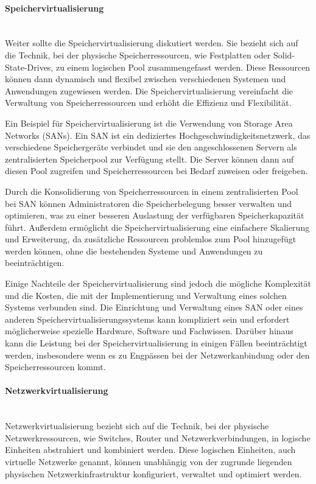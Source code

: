 \paragraph{Speichervirtualisierung\\\\}
Weiter sollte die Speichervirtualisierung diskutiert werden. Sie bezieht sich auf die Technik, bei der physische Speicherressourcen, wie Festplatten oder Solid-State-Drives, zu einem logischen Pool zusammengefasst werden. Diese Ressourcen können dann dynamisch und flexibel zwischen verschiedenen Systemen und Anwendungen zugewiesen werden. Die Speichervirtualisierung vereinfacht die Verwaltung von Speicherressourcen und erhöht die Effizienz und Flexibilität.

Ein Beispiel für Speichervirtualisierung ist die Verwendung von Storage Area Networks (SANs). Ein SAN ist ein dediziertes Hochgeschwindigkeitsnetzwerk, das verschiedene Speichergeräte verbindet und sie den angeschlossenen Servern als zentralisierten Speicherpool zur Verfügung stellt. Die Server können dann auf diesen Pool zugreifen und Speicherressourcen bei Bedarf zuweisen oder freigeben.

Durch die Konsolidierung von Speicherressourcen in einem zentralisierten Pool bei SAN können Administratoren die Speicherbelegung besser verwalten und optimieren, was zu einer besseren Auslastung der verfügbaren Speicherkapazität führt. Außerdem ermöglicht die Speichervirtualisierung eine einfachere Skalierung und Erweiterung, da zusätzliche Ressourcen problemlos zum Pool hinzugefügt werden können, ohne die bestehenden Systeme und Anwendungen zu beeinträchtigen.

Einige Nachteile der Speichervirtualisierung sind jedoch die mögliche Komplexität und die Kosten, die mit der Implementierung und Verwaltung eines solchen Systems verbunden sind. Die Einrichtung und Verwaltung eines SAN oder eines anderen Speichervirtualisierungssystems kann kompliziert sein und erfordert möglicherweise spezielle Hardware, Software und Fachwissen. Darüber hinaus kann die Leistung bei der Speichervirtualisierung in einigen Fällen beeinträchtigt werden, insbesondere wenn es zu Engpässen bei der Netzwerkanbindung oder den Speicherressourcen kommt.
\paragraph{Netzwerkvirtualisierung\\\\}
Netzwerkvirtualisierung bezieht sich auf die Technik, bei der physische Netzwerkressourcen, wie Switches, Router und Netzwerkverbindungen, in logische Einheiten abstrahiert und kombiniert werden. Diese logischen Einheiten, auch virtuelle Netzwerke genannt, können unabhängig von der zugrunde liegenden physischen Netzwerkinfrastruktur konfiguriert, verwaltet und optimiert werden. 

